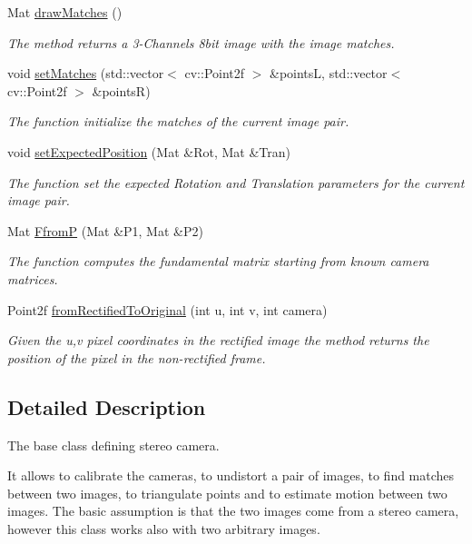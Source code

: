 \begin{DoxyCompactItemize}
Mat \hyperlink{classStereoCamera_a6580ff03c7cec5c385ec717f9c018e21}{draw\+Matches} ()
\begin{DoxyCompactList}\small\item\em The method returns a 3-\/\+Channels 8bit image with the image matches. \end{DoxyCompactList}\item 
void \hyperlink{classStereoCamera_ae683fafa11ea73e4b4c278402be259b6}{set\+Matches} (std\+::vector$<$ cv\+::\+Point2f $>$ \&points\+L, std\+::vector$<$ cv\+::\+Point2f $>$ \&points\+R)
\begin{DoxyCompactList}\small\item\em The function initialize the matches of the current image pair. \end{DoxyCompactList}\item 
void \hyperlink{classStereoCamera_a9ecb303d7b36eaf5f086d8ddebd29b95}{set\+Expected\+Position} (Mat \&Rot, Mat \&Tran)
\begin{DoxyCompactList}\small\item\em The function set the expected Rotation and Translation parameters for the current image pair. \end{DoxyCompactList}\item 
Mat \hyperlink{classStereoCamera_a3fe4e87322f8644cd21ce06e8522c815}{Ffrom\+P} (Mat \&P1, Mat \&P2)
\begin{DoxyCompactList}\small\item\em The function computes the fundamental matrix starting from known camera matrices. \end{DoxyCompactList}\item 
Point2f \hyperlink{classStereoCamera_a3d8fde0cbd4604085b883f22cc606c01}{from\+Rectified\+To\+Original} (int u, int v, int camera)
\begin{DoxyCompactList}\small\item\em Given the u,v pixel coordinates in the rectified image the method returns the position of the pixel in the non-\/rectified frame. \end{DoxyCompactList}\end{DoxyCompactItemize}


\subsection{Detailed Description}
The base class defining stereo camera. 

It allows to calibrate the cameras, to undistort a pair of images, to find matches between two images, to triangulate points and to estimate motion between two images. The basic assumption is that the two images come from a stereo camera, however this class works also with two arbitrary images. 

